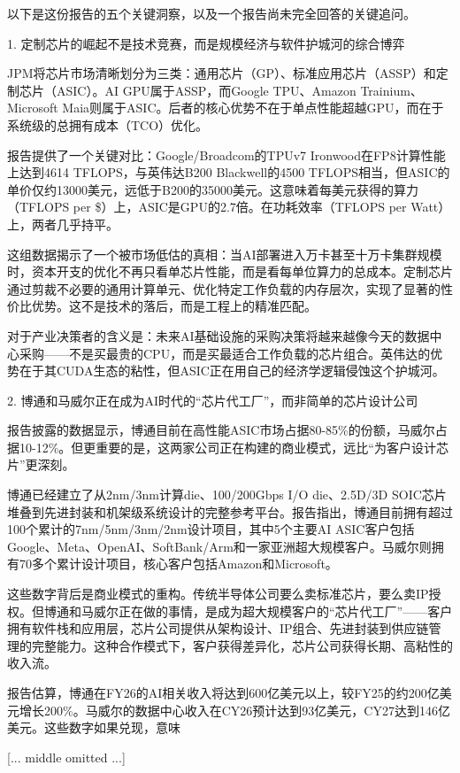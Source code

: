 \documentclass[11pt]{ctexart}
\begin{document}
以下是这份报告的五个关键洞察，以及一个报告尚未完全回答的关键追问。

1. 定制芯片的崛起不是技术竞赛，而是规模经济与软件护城河的综合博弈

JPM将芯片市场清晰划分为三类：通用芯片（GP）、标准应用芯片（ASSP）和定制芯片（ASIC）。AI GPU属于ASSP，而Google TPU、Amazon Trainium、Microsoft Maia则属于ASIC。后者的核心优势不在于单点性能超越GPU，而在于系统级的总拥有成本（TCO）优化。

报告提供了一个关键对比：Google/Broadcom的TPUv7 Ironwood在FP8计算性能上达到4614 TFLOPS，与英伟达B200 Blackwell的4500 TFLOPS相当，但ASIC的单价仅约13000美元，远低于B200的35000美元。这意味着每美元获得的算力（TFLOPS per \$）上，ASIC是GPU的2.7倍。在功耗效率（TFLOPS per Watt）上，两者几乎持平。

这组数据揭示了一个被市场低估的真相：当AI部署进入万卡甚至十万卡集群规模时，资本开支的优化不再只看单芯片性能，而是看每单位算力的总成本。定制芯片通过剪裁不必要的通用计算单元、优化特定工作负载的内存层次，实现了显著的性价比优势。这不是技术的落后，而是工程上的精准匹配。

对于产业决策者的含义是：未来AI基础设施的采购决策将越来越像今天的数据中心采购——不是买最贵的CPU，而是买最适合工作负载的芯片组合。英伟达的优势在于其CUDA生态的粘性，但ASIC正在用自己的经济学逻辑侵蚀这个护城河。

2. 博通和马威尔正在成为AI时代的“芯片代工厂”，而非简单的芯片设计公司

报告披露的数据显示，博通目前在高性能ASIC市场占据80-85\%的份额，马威尔占据10-12\%。但更重要的是，这两家公司正在构建的商业模式，远比“为客户设计芯片”更深刻。

博通已经建立了从2nm/3nm计算die、100/200Gbps I/O die、2.5D/3D SOIC芯片堆叠到先进封装和机架级系统设计的完整参考平台。报告指出，博通目前拥有超过100个累计的7nm/5nm/3nm/2nm设计项目，其中5个主要AI ASIC客户包括Google、Meta、OpenAI、SoftBank/Arm和一家亚洲超大规模客户。马威尔则拥有70多个累计设计项目，核心客户包括Amazon和Microsoft。

这些数字背后是商业模式的重构。传统半导体公司要么卖标准芯片，要么卖IP授权。但博通和马威尔正在做的事情，是成为超大规模客户的“芯片代工厂”——客户拥有软件栈和应用层，芯片公司提供从架构设计、IP组合、先进封装到供应链管理的完整能力。这种合作模式下，客户获得差异化，芯片公司获得长期、高粘性的收入流。

报告估算，博通在FY26的AI相关收入将达到600亿美元以上，较FY25的约200亿美元增长200\%。马威尔的数据中心收入在CY26预计达到93亿美元，CY27达到146亿美元。这些数字如果兑现，意味

[... middle omitted ...]
\end{document}

